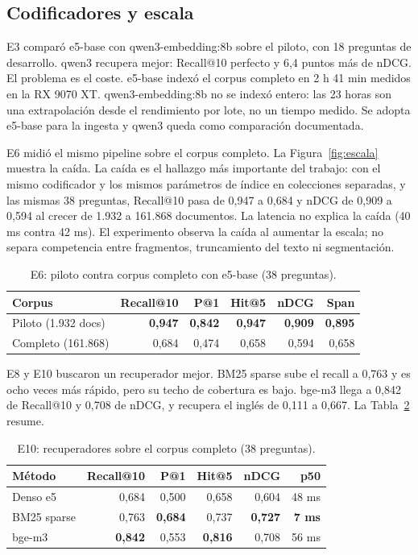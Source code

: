 \subsection{Codificadores y escala}

E3 compar\'o e5-base con qwen3-embedding:8b sobre el piloto, con 18 preguntas de desarrollo. qwen3 recupera mejor: Recall@10 perfecto y 6,4 puntos m\'as de nDCG. El problema es el coste. e5-base index\'o el corpus completo en 2 h 41 min medidos en la RX 9070 XT. qwen3-embedding:8b no se index\'o entero: las 23 horas son una extrapolaci\'on desde el rendimiento por lote, no un tiempo medido. Se adopta e5-base para la ingesta y qwen3 queda como comparaci\'on documentada.

E6 midi\'o el mismo pipeline sobre el corpus completo. La Figura~\ref{fig:escala} muestra la ca\'ida. La ca\'ida es el hallazgo m\'as importante del trabajo: con el mismo codificador y los mismos par\'ametros de \'indice en colecciones separadas, y las mismas 38 preguntas, Recall@10 pasa de 0,947 a 0,684 y nDCG de 0,909 a 0,594 al crecer de 1.932 a 161.868 documentos. La latencia no explica la ca\'ida (40 ms contra 42 ms). El experimento observa la ca\'ida al aumentar la escala; no separa competencia entre fragmentos, truncamiento del texto ni segmentaci\'on.

\begin{table}[t]
\centering
\footnotesize
\caption{E6: piloto contra corpus completo con e5-base (38 preguntas).}
\label{tab:e6}
\begin{tabular}{lrrrrr}
\toprule
Corpus & Recall@10 & P@1 & Hit@5 & nDCG & Span \\
\midrule
Piloto (1.932 docs) & \textbf{0,947} & \textbf{0,842} & \textbf{0,947} & \textbf{0,909} & \textbf{0,895} \\
Completo (161.868) & 0,684 & 0,474 & 0,658 & 0,594 & 0,658 \\
\bottomrule
\end{tabular}
\end{table}

E8 y E10 buscaron un recuperador mejor. BM25 sparse sube el recall a 0,763 y es ocho veces m\'as r\'apido, pero su techo de cobertura es bajo. bge-m3 llega a 0,842 de Recall@10 y 0,708 de nDCG, y recupera el ingl\'es de 0,111 a 0,667. La Tabla~\ref{tab:codificadores} resume.

\begin{table}[t]
\centering
\footnotesize
\caption{E10: recuperadores sobre el corpus completo (38 preguntas).}
\label{tab:codificadores}
\begin{tabular}{lrrrrr}
\toprule
M\'etodo & Recall@10 & P@1 & Hit@5 & nDCG & p50 \\
\midrule
Denso e5 & 0,684 & 0,500 & 0,658 & 0,604 & 48 ms \\
BM25 sparse & 0,763 & \textbf{0,684} & 0,737 & \textbf{0,727} & \textbf{7 ms} \\
bge-m3 & \textbf{0,842} & 0,553 & \textbf{0,816} & 0,708 & 56 ms \\
\bottomrule
\end{tabular}
\end{table}


